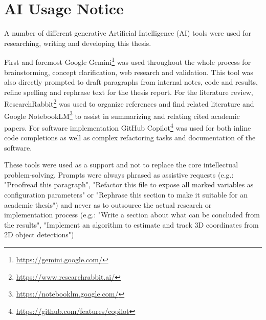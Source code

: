 \documentclass[
	parspace, %
	noindent, %
	final, %
]{elteikthesis}
\begin{document}
\cleardoublepage

{}
\printbibliography[title=\biblabel]
\cleardoublepage

\appendix
{}
{}

\makeatletter
\renewcommand{\@makechapterhead}[1]{%
  \vspace*{0\p@}%
  {\parindent \z@ \raggedright \normalfont
    \ifnum \c@secnumdepth >\m@ne
        \huge\bfseries \@chapapp\space \thechapter
        \par\nobreak
        \vskip 0\p@ %
    \fi
    \interlinepenalty\@M
    \Huge \bfseries #1\par\nobreak
    \vskip 0\p@ %
  }}
\makeatother

\chapter{AI Usage Notice}
\label{app:ai-usage}

A number of different generative Artificial Intelligence (AI) tools were used for researching, writing and developing this thesis.

First and foremost Google Gemini\footnote{\url{https://gemini.google.com/}} was used throughout the whole process for brainstorming, concept clarification, web research and validation. This tool was also directly prompted to draft paragraphs from internal notes, code and results, refine spelling and rephrase text for the thesis report.
For the literature review, ResearchRabbit\footnote{\url{https://www.researchrabbit.ai/}} was used to organize references and find related literature and Google NotebookLM\footnote{\url{https://notebooklm.google.com/}} to assist in summarizing and relating cited academic papers.
For software implementation GitHub Copilot\footnote{\url{https://github.com/features/copilot}} was used for both inline code completions as well as complex refactoring tasks and documentation of the software.

These tools were used as a support and not to replace the core intellectual problem-solving. Prompts were always phrased as assistive requests (e.g.: "Proofread this paragraph", "Refactor this file to expose all marked variables as configuration parameters" or "Rephrase this section to make it suitable for an academic thesis") and never as to outsource the actual research or implementation process (e.g.: "Write a section about what can be concluded from the results", "Implement an algorithm to estimate and track 3D coordinates from 2D object detections")
\end{document}
